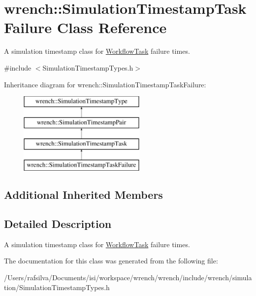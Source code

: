 \hypertarget{classwrench_1_1_simulation_timestamp_task_failure}{}\section{wrench\+:\+:Simulation\+Timestamp\+Task\+Failure Class Reference}
\label{classwrench_1_1_simulation_timestamp_task_failure}


A simulation timestamp class for \hyperlink{classwrench_1_1_workflow_task}{Workflow\+Task} failure times.  




{\ttfamily \#include $<$Simulation\+Timestamp\+Types.\+h$>$}

Inheritance diagram for wrench\+:\+:Simulation\+Timestamp\+Task\+Failure\+:\begin{figure}[H]
\begin{center}
\leavevmode
\includegraphics[height=4.000000cm]{classwrench_1_1_simulation_timestamp_task_failure}
\end{center}
\end{figure}
\subsection*{Additional Inherited Members}


\subsection{Detailed Description}
A simulation timestamp class for \hyperlink{classwrench_1_1_workflow_task}{Workflow\+Task} failure times. 

The documentation for this class was generated from the following file\+:\begin{DoxyCompactItemize}
\item 
/\+Users/rafsilva/\+Documents/isi/workspace/wrench/wrench/include/wrench/simulation/Simulation\+Timestamp\+Types.\+h\end{DoxyCompactItemize}
